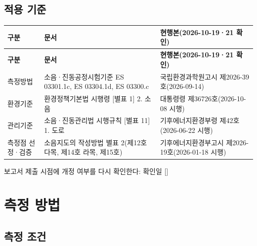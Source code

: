 \documentclass[10.5pt,a4paper]{article}
\newcommand{\IN}{[\quad]}
\newcommand{\hd}[1]{\cellcolor{headfill}\textbf{\sffamily #1}}
\begin{document}
\addtocounter{table}{-1}
\normalsize
{}\subsection{적용 기준}
\footnotesize
\begin{longtable}{>{\raggedright\arraybackslash}p{}>{\raggedright\arraybackslash}p{}>{\raggedright\arraybackslash}p{}}
\toprule
\hd{구분} & \hd{문서} & \hd{현행본(2026-10-19·21 확인)} \\ \midrule
\endfirsthead
\toprule
\hd{구분} & \hd{문서} & \hd{현행본(2026-10-19·21 확인)} \\ \midrule
\endhead
\bottomrule
\endlastfoot
측정방법 & 소음·진동공정시험기준 ES 03301.1c, ES 03304.1d, ES 03300.c & 국립환경과학원고시 제2026-39호(2026-09-14) \\ \midrule
환경기준 & 환경정책기본법 시행령 [별표 1] 2. 소음 & 대통령령 제36726호(2026-10-08 시행) \\ \midrule
관리기준 & 소음·진동관리법 시행규칙 [별표 11] 1. 도로 & 기후에너지환경부령 제42호(2026-06-22 시행) \\ \midrule
측정점 선정·검증 & 소음지도의 작성방법 별표 2(제12호 다목, 제14호 라목, 제15호) & 기후에너지환경부고시 제2026-19호(2026-01-18 시행) \\
\end{longtable}
\addtocounter{table}{-1}
\normalsize
{\small 보고서 제출 시점에 개정 여부를 다시 확인한다: 확인일 \IN\par}
\section{측정 방법}
\subsection{측정 조건}
\footnotesize
\end{document}

